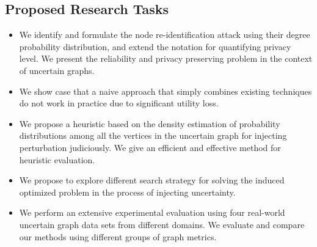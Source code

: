 \subsection{Proposed Research Tasks}
\begin{itemize}
    \item {We identify and formulate the node re-identification attack using their degree probability distribution, and extend the {\keobf} notation for quantifying privacy level. We present the reliability and privacy preserving problem in the context of uncertain graphs.}
    \item {We show case that a naive approach that simply combines existing techniques do not work in practice due to significant utility loss.}
    \item {We propose a heuristic based on the density estimation of probability distributions among all the vertices in the uncertain graph for injecting perturbation judiciously. We give an efficient and effective method for heuristic evaluation.}
    \item {We propose to explore different search strategy for solving the induced optimized problem in the process of injecting uncertainty. }
    \item {We perform an extensive experimental evaluation using four real-world uncertain graph data sets from different  domains. We evaluate and compare our methods using different groups of graph metrics.}
\end{itemize}